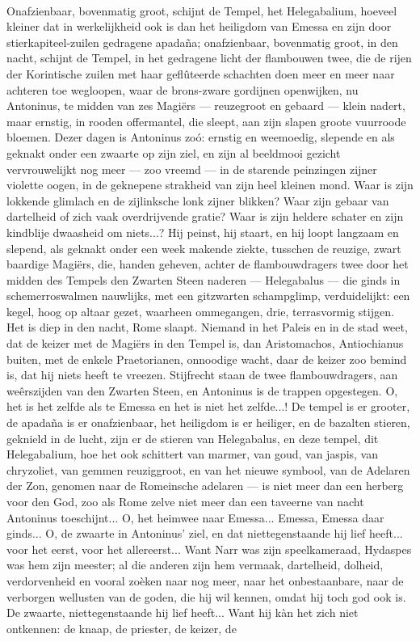 \documentclass[a4paper, 12pt, oneside, dutch]{article}
\begin{document}
\paragraph{}
Onafzienbaar, bovenmatig groot, schijnt de Tempel, het Helegabalium, hoeveel kleiner dat in werkelijkheid ook is dan het heiligdom van Emessa en zijn door stierkapiteel-zuilen gedragene apadaña; onafzienbaar, bovenmatig groot, in den nacht, schijnt de Tempel, in het gedragene licht der flambouwen twee, die de rijen der Korintische zuilen met haar geflûteerde schachten doen meer en meer naar achteren toe wegloopen, waar de brons-zware gordijnen openwijken, nu Antoninus, te midden van zes Magiërs --- reuzegroot en gebaard --- klein nadert, maar ernstig, in rooden offermantel, die sleept, aan zijn slapen groote vuurroode bloemen. Dezer dagen is Antoninus zoó: ernstig en weemoedig, slepende en als geknakt onder een zwaarte op zijn ziel, en zijn al beeldmooi gezicht vervrouwelijkt nog meer --- zoo vreemd --- in de starende peinzingen zijner violette oogen, in de geknepene strakheid van zijn heel kleinen mond. Waar is zijn lokkende glimlach en de zijlinksche lonk zijner blikken? Waar zijn gebaar van dartelheid of zich vaak overdrijvende gratie? Waar is zijn heldere schater en zijn kindblije dwaasheid om niets...? Hij peinst, hij staart, en hij loopt langzaam en slepend, als geknakt onder een week makende ziekte, tusschen de reuzige, zwart baardige Magiërs, die, handen geheven, achter de flambouwdragers twee door het midden des Tempels den Zwarten Steen naderen --- Helegabalus --- die ginds in schemerroswalmen nauwlijks, met een gitzwarten schampglimp, verduidelijkt: een kegel, hoog op altaar gezet, waarheen ommegangen, drie, terrasvormig stijgen. Het is diep in den nacht, Rome slaapt. Niemand in het Paleis en in de stad weet, dat de keizer met de Magiërs in den Tempel is, dan Aristomachos, Antiochianus buiten, met de enkele Praetorianen, onnoodige wacht, daar de keizer zoo bemind is, dat hij niets heeft te vreezen. Stijfrecht staan de twee flambouwdragers, aan weêrszijden van den Zwarten Steen, en Antoninus is de trappen opgestegen. O, het is het zelfde als te Emessa en het is niet het zelfde...! De tempel is er grooter, de apadaña is er onafzienbaar, het heiligdom is er heiliger, en de bazalten stieren, geknield in de lucht, zijn er de stieren van Helegabalus, en deze tempel, dit Helegabalium, hoe het ook schittert van marmer, van goud, van jaspis, van chryzoliet, van gemmen reuziggroot, en van het nieuwe symbool, van de Adelaren der Zon, genomen naar de Romeinsche adelaren --- is niet meer dan een herberg voor den God, zoo als Rome zelve niet meer dan een taveerne van nacht Antoninus toeschijnt... O, het heimwee naar Emessa... Emessa, Emessa daar ginds... O, de zwaarte in Antoninus' ziel, en dat niettegenstaande hij lief heeft... voor het eerst, voor het allereerst... Want Narr was zijn speelkameraad, Hydaspes was hem zijn meester; al die anderen zijn hem vermaak, dartelheid, dolheid, verdorvenheid en vooral zoèken naar nog meer, naar het onbestaanbare, naar de verborgen wellusten van de goden, die hij wil kennen, omdat hij toch god ook is. De zwaarte, niettegenstaande hij lief heeft... Want hij kàn het zich niet ontkennen: de knaap, de priester, de keizer, de 
\end{document}
